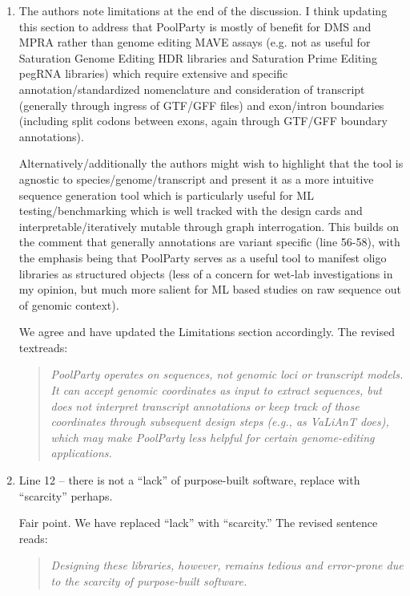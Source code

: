 \documentclass[11pt]{article}
\newenvironment{response}{\par\color{responseblue}}{\par}
\newenvironment{msquote}
  {\begin{quote}\color{responseblue}\itshape\noindent\ignorespaces}
  {\end{quote}}
\begin{document}
\begin{enumerate}
\item The authors note limitations at the end of the discussion. I think
updating this section to address that PoolParty is mostly of benefit for DMS and
MPRA rather than genome editing MAVE assays (e.g. not as useful for Saturation
Genome Editing HDR libraries and Saturation Prime Editing pegRNA libraries)
which require extensive and specific annotation/standardized nomenclature and
consideration of transcript (generally through ingress of GTF/GFF files) and
exon/intron boundaries (including split codons between exons, again through
GTF/GFF boundary annotations).

Alternatively/additionally the authors might wish to highlight that the tool is
agnostic to species/genome/transcript and present it as a more intuitive
sequence generation tool which is particularly useful for ML
testing/benchmarking which is well tracked with the design cards and
interpretable/iteratively mutable through graph interrogation. This builds on
the comment that generally annotations are variant specific (line 56-58), with
the emphasis being that PoolParty serves as a useful tool to manifest oligo
libraries as structured objects (less of a concern for wet-lab investigations
in my opinion, but much more salient for ML based studies on raw sequence out of
genomic context).

\begin{response}
We agree and have updated the Limitations section accordingly. The revised textreads:
\end{response}

\begin{msquote} 
PoolParty operates on sequences, not genomic loci or transcript models. It can accept genomic coordinates as input to extract sequences, but does not interpret transcript annotations or keep track of those coordinates through subsequent design steps (e.g., as VaLiAnT does), which may make PoolParty less helpful for certain genome-editing applications.
\end{msquote}

\item Line 12 -- there is not a ``lack'' of purpose-built software, replace
with ``scarcity'' perhaps.

\begin{response}
Fair point. We have replaced ``lack'' with ``scarcity.'' The revised sentence reads:
\end{response}

\begin{msquote}
Designing these libraries, however, remains tedious and error-prone due to the scarcity of purpose-built software.
\end{msquote}


\end{enumerate}
\end{document}
